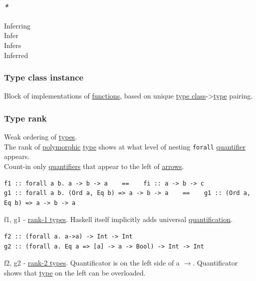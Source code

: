 \documentclass[11pt]{article}
\begin{document}
\paragraph{\emph{*}}
\label{sec:org1fd4d9d}

\label{org6183920}Inferring\\
\label{org6da926a}Infer\\
\label{org04f62d7}Infers\\
\label{org1ccf6d8}Inferred\\

\subsubsection{\label{org5d45c00}Type class instance}
\label{sec:orge36d7b4}
Block of implementations of \hyperref[orgaa8fb87]{functions}, based on unique \hyperref[org16d8a26]{type class}->\hyperref[orgc4aea2f]{type} pairing.\\

\subsubsection{\label{org6b9f1c6}Type rank}
\label{sec:org1966795}
Weak ordering of \hyperref[org4209edd]{types}.\\

The rank of \hyperref[orgac4d581]{polymorphic} \hyperref[orgc4aea2f]{type} shows at what level of nesting \texttt{forall} \hyperref[org357bc41]{quantifier} appears.\\
Count-in only \hyperref[org56c9794]{quantifiers} that appear to the left of \hyperref[org9c45dc6]{arrows}.\\
\begin{verbatim}
f1 :: forall a b. a -> b -> a    ==    fi :: a -> b -> c
g1 :: forall a b. (Ord a, Eq b) => a -> b -> a    ==    g1 :: (Ord a, Eq b) => a -> b -> a
\end{verbatim}
f1, g1 - \hyperref[org49e3bd9]{rank-1 types}. Haskell itself implicitly adds universal \hyperref[orgfcc3eee]{quantification}.\\

\begin{verbatim}
f2 :: (forall a. a->a) -> Int -> Int
g2 :: (forall a. Eq a => [a] -> a -> Bool) -> Int -> Int
\end{verbatim}
f2, g2 - \hyperref[org626d943]{rank-2 types}. Quantificator is on the left side of a \(\to\). Quantificator shows that \hyperref[orgc4aea2f]{type} on the left can be overloaded.\\
\end{document}
